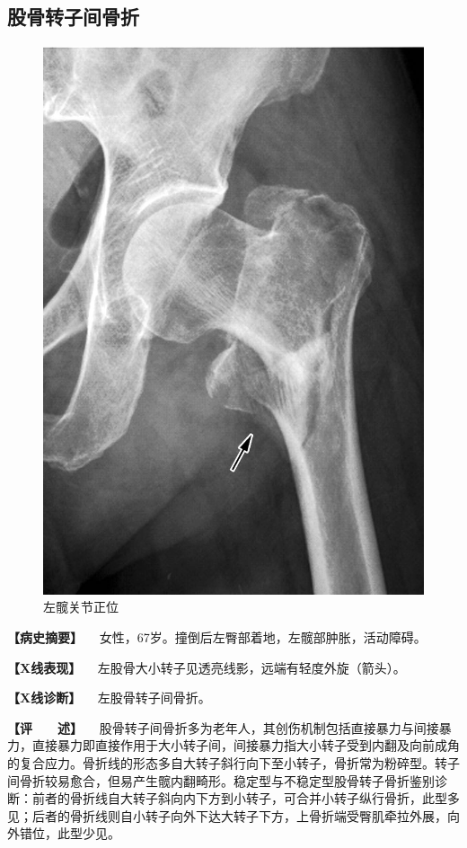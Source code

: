 \subsection{股骨转子间骨折}

\begin{figure}[!htbp]
 \centering
 \includegraphics{./images/Image00044.jpg}
 \captionsetup{justification=centering}
 \caption{左髋关节正位}
 \label{fig2-3-17}
  \end{figure} 

\textbf{【病史摘要】}
　女性，67岁。撞倒后左臀部着地，左髋部肿胀，活动障碍。

\textbf{【X线表现】}
　左股骨大小转子见透亮线影，远端有轻度外旋（箭头）。

\textbf{【X线诊断】} 　左股骨转子间骨折。

\textbf{【评　　述】}
　股骨转子间骨折多为老年人，其创伤机制包括直接暴力与间接暴力，直接暴力即直接作用于大小转子间，间接暴力指大小转子受到内翻及向前成角的复合应力。骨折线的形态多自大转子斜行向下至小转子，骨折常为粉碎型。转子间骨折较易愈合，但易产生髋内翻畸形。稳定型与不稳定型股骨转子骨折鉴别诊断：前者的骨折线自大转子斜向内下方到小转子，可合并小转子纵行骨折，此型多见；后者的骨折线则自小转子向外下达大转子下方，上骨折端受臀肌牵拉外展，向外错位，此型少见。

